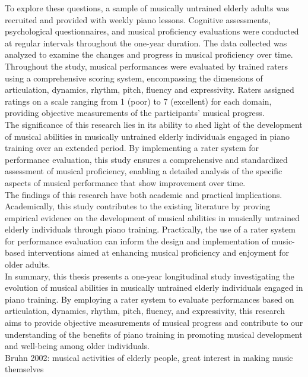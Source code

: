 To explore these questions, a sample of musically untrained elderly adults was recruited and provided with weekly piano lessons. Cognitive assessments, psychological questionnaires, and musical proficiency evaluations were conducted at regular intervals throughout the one-year duration. The data collected was analyzed to examine the changes and progress in musical proficiency over time. Throughout the study, musical performances were evaluated by trained raters using a comprehensive scoring system, encompassing the dimensions of articulation, dynamics, rhythm, pitch, fluency and expressivity. Raters assigned ratings on a scale ranging from 1 (poor) to 7 (excellent) for each domain, providing objective measurements of the participants' musical progress.\\
The significance of this research lies in its ability to shed light of the development of musical abilities in musically untrained elderly individuals engaged in piano training over an extended period. By implementing a rater system for performance evaluation, this study ensures a comprehensive and standardized assessment of musical proficiency, enabling a detailed analysis of the specific aspects of musical performance that show improvement over time.\\
The findings of this research have both academic and practical implications. Academically, this study contributes to the existing literature by proving empirical evidence on the development of musical abilities in musically untrained elderly individuals through piano training. Practically, the use of a rater system for performance evaluation can inform the design and implementation of music-based interventions aimed at enhancing musical proficiency and enjoyment for older adults.\\
In summary, this thesis presents a one-year longitudinal study investigating the evolution of musical abilities in musically untrained elderly individuals engaged in piano training. By employing a rater system to evaluate performances based on articulation, dynamics, rhythm, pitch, fluency, and expressivity, this research aims to provide objective measurements of musical progress and contribute to our understanding of the benefits of piano training in promoting musical development and well-being among older individuals. \\

Bruhn 2002: musical activities of elderly people, great interest in making music themselves
